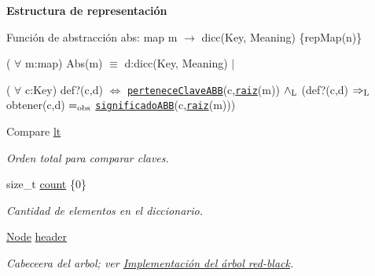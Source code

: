 \begin{Indent}{\bf Estructura de representación}
{\begin{DoxyParagraph}{Función de abstracción}
abs\-: map m $\to$ dicc(Key, Meaning) \{rep\-Map(n)\}\par
 ( $\forall$ m\-:map) Abs(m) $\equiv$ d\-:dicc(Key, Meaning) $\vert$ \par
 ( $\forall$ c\-:Key) def?(c,d) $\Leftrightarrow$ \href{axiomas.html#perteneceClaveABB}{\tt pertenece\-Clave\-A\-B\-B}(c,\href{axiomas.html#raiz}{\tt raiz}(m)) $\land_{\rm L}$ (def?(c,d) $\Rightarrow_{\rm L}$ obtener(c,d) $=_{\rm obs}$ \href{axiomas.html#significadoABB}{\tt significado\-A\-B\-B}(c,\href{axiomas.html#raiz}{\tt raiz}(m))) 
\end{DoxyParagraph}
}\begin{DoxyCompactItemize}
\item 
Compare \hyperlink{classaed2_1_1map_a0e5be36fae0693e4665bd2a615e7550a_a0e5be36fae0693e4665bd2a615e7550a}{lt}
\begin{DoxyCompactList}\small\item\em Orden total para comparar claves. \end{DoxyCompactList}\item 
size\-\_\-t \hyperlink{classaed2_1_1map_a44236c4f16cdc20a10759862b198bde4_a44236c4f16cdc20a10759862b198bde4}{count} \{0\}
\begin{DoxyCompactList}\small\item\em Cantidad de elementos en el diccionario. \end{DoxyCompactList}\item 
\hyperlink{structaed2_1_1map_1_1Node}{Node} \hyperlink{classaed2_1_1map_a92d93f905c8ad73fba18fdc7e8915cce_a92d93f905c8ad73fba18fdc7e8915cce}{header}
\begin{DoxyCompactList}\small\item\em Cabeceera del arbol; ver \hyperlink{Implementacion}{Implementación del árbol red-\/black}. \end{DoxyCompactList}\end{DoxyCompactItemize}
\end{Indent}
